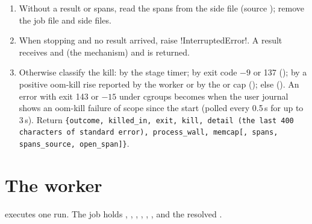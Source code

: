\begin{algorithm}
\begin{enumerate}
   the result,  the scope's oom-kill rise,  the spans (source ).
\item Without a result or spans, read the spans from the side file (source );
  remove the job file and side files.
\item When stopping and no result arrived, raise \py!InterruptedError!. A result receives
   and  (the mechanism) and is returned.
\item Otherwise classify the kill:  by the stage timer;  by exit code
  $-9$ or 137 ();  by a positive oom-kill rise reported by the worker or
  by the  or  cap ();
  else  (). An error with exit 143 or $-15$ under cgroups becomes
   when the user journal shows an oom-kill failure of scope  since
  the start (polled every 0.5\,s for up to 3\,s). Return \texttt{\{outcome, killed\_in, exit, kill, detail (the last 400 characters of standard error), process\_wall, memcap[, spans, spans\_source, open\_span]\}}.
\end{enumerate}
\end{algorithm}

\section{The worker}\label{sec:bench-worker}

 executes one run. The job holds
, , , , , , and the
resolved .

